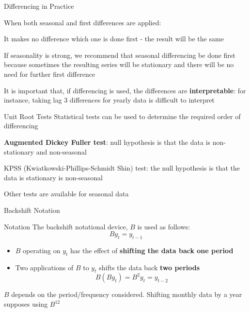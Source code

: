 \documentclass{beamer}
\newenvironment{wideitemize}{\itemize\addtolength{\itemsep}{10pt}}{\enditemize}
\newenvironment{wideenumerate}{\enumerate\addtolength{\itemsep}{10pt}}{\endenumerate}
\begin{document}
\begin{frame}{Differencing in Practice}

  When both seasonal and first differences are applied:

  \begin{wideitemize}
    \item It makes no difference which one is done first - the result will be the same
    \item If seasonality is strong, we recommend that seasonal differencing be done first because sometimes the resulting series will be stationary and there will be no need for further first difference
    \item It is important that, if differencing is used, the differences are \textbf{interpretable}: for instance, taking lag 3 differences for yearly data is difficult to interpret
  \end{wideitemize}
\end{frame}


\begin{frame}{Unit Root Tests}
  Statistical tests can be used to determine the required order of differencing

  \begin{wideenumerate}
    \item \textbf{Augmented Dickey Fuller test}: null hypothesis is that the data is non-stationary and non-seasonal
    \item KPSS (Kwiatkowski-Phillips-Schmidt Shin) test: the null hypothesis is that the data is stationary is non-seasonal
    \item Other tests are available for seasonal data
  \end{wideenumerate}
  
  
\end{frame}



\begin{frame}{Backshift Notation}

  \begin{block}{Notation}
    The backshift notational device, $B$ is used as follows:\\

    \begin{equation*}
      B y_t = y_{t-1}
    \end{equation*}
  \end{block}

    
    \begin{itemize}
    \item   $B$ operating on $y_t$ has the effect of \textbf{shifting the data back one period}
    \item   Two applications of $B$ to $y_t$ shifts the data back \textbf{two periods}
      \begin{equation*}
        B(By_t) = B^2 y_t = y_{t-2}
      \end{equation*}
    \end{itemize}
    
$B$ depends on the period/frequency considered. Shifting monthly data by a year supposes using $B^{12}$

\end{frame}
\end{document}
